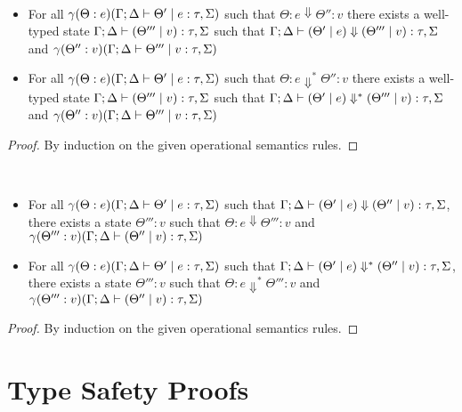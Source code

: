 \documentclass[acmsmall,review,anonymous,screen]{acmart}
\begin{document}
\begin{lemma}~\label{lem:naturaltoinstr}
  \begin{itemize}
    \item For all $\gamma(\Theta : e)(\Gamma ; \Delta \vdash \Theta' \mid
e : \tau,\Sigma)$ such that $\Theta : e \Downarrow \Theta'' : v$
there exists a well-typed state $\Gamma ; \Delta \vdash (\Theta''' \mid v) :
\tau,\Sigma$ such that $\Gamma ; \Delta \vdash (\Theta' \mid e) \Downarrow
(\Theta''' \mid v) : \tau,\Sigma$ and $\gamma(\Theta'' : v)(\Gamma ; \Delta
\vdash \Theta''' \mid v : \tau,\Sigma)$
\item For all $\gamma(\Theta : e)(\Gamma ; \Delta \vdash \Theta' \mid
e : \tau,\Sigma)$ such that $\Theta : e \Downarrow^* \Theta'' : v$
there exists a well-typed state $\Gamma ; \Delta \vdash (\Theta''' \mid v) :
\tau,\Sigma$ such that $\Gamma ; \Delta \vdash (\Theta' \mid e) \Downarrow^*
(\Theta''' \mid v) : \tau,\Sigma$ and $\gamma(\Theta'' : v)(\Gamma ; \Delta
\vdash \Theta''' \mid v : \tau,\Sigma)$
\end{itemize}
\end{lemma}
\begin{proof}
By induction on the given operational semantics rules.
  \end{proof}

\begin{lemma}~\label{lem:instrtonatural}
  \begin{itemize}
\item  For all $\gamma(\Theta : e)(\Gamma ; \Delta \vdash \Theta' \mid
e : \tau,\Sigma)$ such that $\Gamma ; \Delta \vdash (\Theta' \mid e) \Downarrow
(\Theta'' \mid v) : \tau,\Sigma$, there exists a state $\Theta''' : v$
such that $\Theta : e \Downarrow \Theta''' : v$ and
$\gamma(\Theta''' : v)(\Gamma ; \Delta \vdash (\Theta'' \mid v) :
\tau,\Sigma)$
\item For all $\gamma(\Theta : e)(\Gamma ; \Delta \vdash \Theta' \mid
e : \tau,\Sigma)$ such that $\Gamma ; \Delta \vdash (\Theta' \mid e) \Downarrow^*
(\Theta'' \mid v) : \tau,\Sigma$, there exists a state $\Theta''' : v$
such that $\Theta : e \Downarrow^* \Theta''' : v$ and
$\gamma(\Theta''' : v)(\Gamma ; \Delta \vdash (\Theta'' \mid v) :
\tau,\Sigma)$
   \end{itemize}
 \end{lemma}
\begin{proof}
By induction on the given operational semantics rules.
  \end{proof}


  



\section{Type Safety Proofs}\label{app:proofs}
\end{document}
